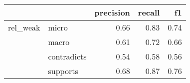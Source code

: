 \begin{tabular}{llrrr}
\toprule
         &          &  precision &  recall &   f1 \\
\midrule
rel\_weak & micro &       0.66 &    0.83 & 0.74 \\
         & macro &       0.61 &    0.72 & 0.66 \\
         & contradicts &       0.54 &    0.58 & 0.56 \\
         & supports &       0.68 &    0.87 & 0.76 \\
\bottomrule
\end{tabular}
